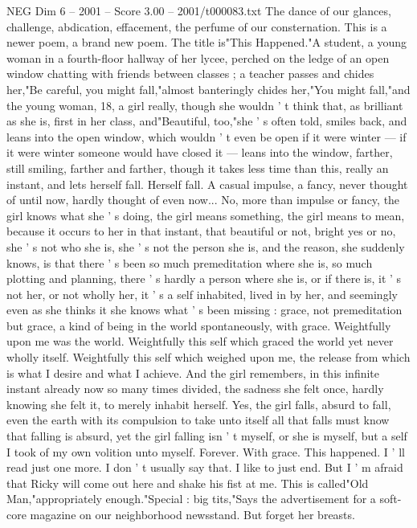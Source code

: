 \begin{textsample}{NEG Dim 6 – 2001 – Score 3.00 – 2001/t000083.txt}
The dance of our glances, challenge, abdication, effacement, the perfume of our consternation.
This is a newer poem, a brand new poem.
The title is"This Happened."A student, a young woman in a fourth-floor hallway of her lycee, perched on the ledge of an open window chatting with friends between classes ; a teacher passes and chides her,"Be careful, you might fall,"almost banteringly chides her,"You might fall,"and the young woman, 18, a girl really, though she wouldn ' t think that, as brilliant as she is, first in her class, and"Beautiful, too,"she ' s often told, smiles back, and leans into the open window, which wouldn ' t even be open if it were winter — if it were winter someone would have closed it — leans into the window, farther, still smiling, farther and farther, though it takes less time than this, really an instant, and lets herself fall.
Herself fall.
A casual impulse, a fancy, never thought of until now, hardly thought of even now...
No, more than impulse or fancy, the girl knows what she ' s doing, the girl means something, the girl means to mean, because it occurs to her in that instant, that beautiful or not, bright yes or no, she ' s not who she is, she ' s not the person she is, and the reason, she suddenly knows, is that there ' s been so much premeditation where she is, so much plotting and planning, there ' s hardly a person where she is, or if there is, it ' s not her, or not wholly her, it ' s a self inhabited, lived in by her, and seemingly even as she thinks it she knows what ' s been missing : grace, not premeditation but grace, a kind of being in the world spontaneously, with grace.
Weightfully upon me was the world.
Weightfully this self which graced the world yet never wholly itself.
Weightfully this self which weighed upon me, the release from which is what I desire and what I achieve.
And the girl remembers, in this infinite instant already now so many times divided, the sadness she felt once, hardly knowing she felt it, to merely inhabit herself.
Yes, the girl falls, absurd to fall, even the earth with its compulsion to take unto itself all that falls must know that falling is absurd, yet the girl falling isn ' t myself, or she is myself, but a self I took of my own volition unto myself.
Forever.
With grace.
This happened.
I ' ll read just one more.
I don ' t usually say that.
I like to just end.
But I ' m afraid that Ricky will come out here and shake his fist at me.
This is called"Old Man,"appropriately enough."Special : big tits,"Says the advertisement for a soft-core magazine on our neighborhood newsstand.
But forget her breasts.

\end{textsample}
